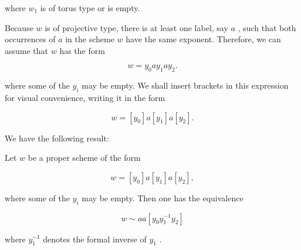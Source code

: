 \begin{theorem}
where \({w}_{1}\) is of torus type or is empty.

Because \(w\) is of projective type, there is at least one label, say \(a\) , such that both occurrences of \(a\) in the scheme \(w\) have the same exponent. Therefore, we can assume that \(w\) has the form

\[
w = {y}_{0}a{y}_{1}a{y}_{2}.
\]

where some of the \({y}_{i}\) may be empty. We shall insert brackets in this expression for visual convenience, writing it in the form

\[
w = \left\lbrack  {y}_{0}\right\rbrack  a\left\lbrack  {y}_{1}\right\rbrack  a\left\lbrack  {y}_{2}\right\rbrack  .
\]

We have the following result:
\end{theorem}

\begin{lemma} Let \(w\) be a proper scheme of the form

\[
w = \left\lbrack  {y}_{0}\right\rbrack  a\left\lbrack  {y}_{1}\right\rbrack  a\left\lbrack  {y}_{2}\right\rbrack  ,
\]

where some of the \({y}_{i}\) may be empty. Then one has the equivalence

\[
w \sim  {aa}\left\lbrack  {{y}_{0}{y}_{1}^{-1}{y}_{2}}\right\rbrack
\]

where \({y}_{1}^{-1}\) denotes the formal inverse of \({y}_{1}\) .
\end{lemma}

